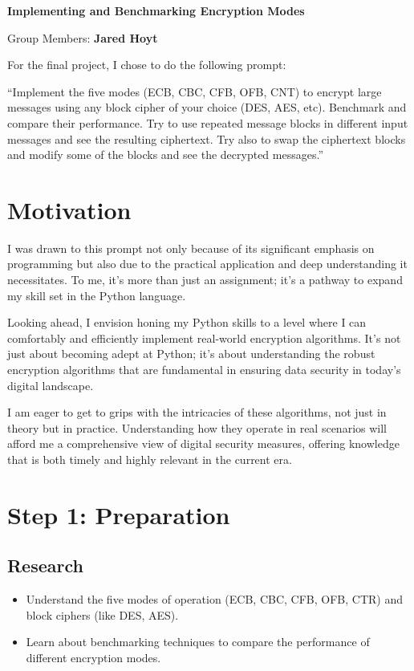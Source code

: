 \documentclass{exam}
\begin{document}
  \begin{center}
    \Large \textbf{Implementing and Benchmarking Encryption Modes}
  \end{center}

  \vspace{1em}

  Group Members: \textbf{Jared Hoyt}

  For the final project, I chose to do the following prompt:

  ``Implement the five modes (ECB, CBC, CFB, OFB, CNT) to encrypt large messages using any block cipher of your choice (DES, AES, etc). Benchmark and compare their performance. Try to use repeated message blocks in different input messages and see the resulting ciphertext. Try also to swap the ciphertext blocks and modify some of the blocks and see the decrypted messages.''

  \section*{Motivation}
  I was drawn to this prompt not only because of its significant emphasis on programming but also due to the practical application and deep understanding it necessitates. To me, it's more than just an assignment; it's a pathway to expand my skill set in the Python language.

  Looking ahead, I envision honing my Python skills to a level where I can comfortably and efficiently implement real-world encryption algorithms. It’s not just about becoming adept at Python; it’s about understanding the robust encryption algorithms that are fundamental in ensuring data security in today’s digital landscape.

  I am eager to get to grips with the intricacies of these algorithms, not just in theory but in practice. Understanding how they operate in real scenarios will afford me a comprehensive view of digital security measures, offering knowledge that is both timely and highly relevant in the current era.

  \section*{Step 1: Preparation}

  \subsection*{Research}
  \begin{itemize}
      \item Understand the five modes of operation (ECB, CBC, CFB, OFB, CTR) and block ciphers (like DES, AES).
      \item Learn about benchmarking techniques to compare the performance of different encryption modes.
  \end{itemize}
\end{document}
